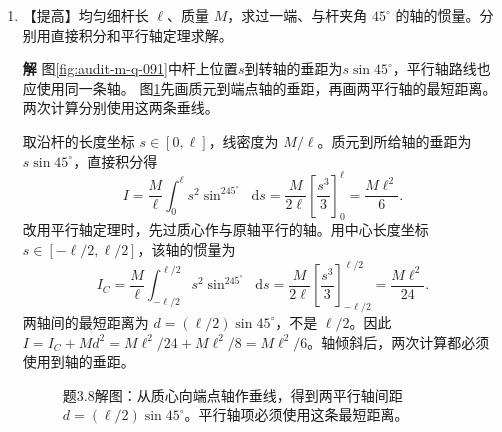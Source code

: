 \documentclass[11pt,openany,fontset=fandol]{ctexbook}
\theoremstyle{plain}\newtheorem{theorem}{定理}[chapter]\newtheorem{proposition}[theorem]{命题}
\theoremstyle{definition}\newtheorem{definition}{定义}[chapter]\newtheorem{example}{例}[chapter]
\theoremstyle{remark}\newtheorem*{remark}{说明}
\newcommand{\SolutionStart}{\par\nobreak\medskip\nobreak\noindent\textbf{解}\quad\ignorespaces}
\newenvironment{solution}{\SolutionStart}{\par\medskip}
\newcommand{\dd}{\mathop{}\!\mathrm d}\newcommand{\ii}{\mathrm i}\newcommand{\ee}{\mathrm e}
\begin{document}
\begin{enumerate}[label=3.\arabic*]
\begin{solution}
具体取 $\eta=1$，则 $U=k(x+y)^2/2$，零方向为 $x=-y$。分别补上 $+\alpha(x-y)^4$ 和 $-\alpha(x-y)^4$，$\alpha>0$。前者在所有非零的小位移处都比原点势能高，原点成为严格极小点；后者沿 $x=-y$ 降低，原点不稳定。两种势能在原点的二阶导数完全相同。故出现零特征值时，二阶展开只能找出需要继续检查的方向，必须结合高阶项判断完整系统。

两条曲线在原点的二阶曲率同为零。沿零方向保留四次项后，一条势能升高，另一条降低，稳定性才得以区分。
\end{solution}

\item \begin{minipage}[t]{\linewidth}
【提高】均匀细杆长 $\ell$、质量 $M$，求过一端、与杆夹角 $45^\circ$ 的轴的惯量。分别用直接积分和平行轴定理求解。

\end{minipage}

\begin{solution}
图\ref{fig:audit-m-q-091}中杆上位置$s$到转轴的垂距为$s\sin45^\circ$，平行轴路线也应使用同一条轴。
图\ref{fig:ex-3-8}先画质元到端点轴的垂距，再画两平行轴的最短距离。两次计算分别使用这两条垂线。

取沿杆的长度坐标 $s\in[0,\ell]$，线密度为 $M/\ell$。质元到所给轴的垂距为 $s\sin45^\circ$，直接积分得
\[
I=\frac M\ell\int_0^\ell s^2\sin^245^\circ\dd s
=\frac{M}{2\ell}\left[\frac{s^3}{3}\right]_0^\ell
=\frac{M\ell^2}{6}.
\]
改用平行轴定理时，先过质心作与原轴平行的轴。用中心长度坐标 $s\in[-\ell/2,\ell/2]$，该轴的惯量为
\[
I_C=\frac M\ell\int_{-\ell/2}^{\ell/2}s^2\sin^245^\circ\dd s
=\frac{M}{2\ell}\left[\frac{s^3}{3}\right]_{-\ell/2}^{\ell/2}
=\frac{M\ell^2}{24}.
\]
两轴间的最短距离为 $d=(\ell/2)\sin45^\circ$，不是 $\ell/2$。因此 $I=I_C+Md^2=M\ell^2/24+M\ell^2/8=M\ell^2/6$。轴倾斜后，两次计算都必须使用到轴的垂距。

\begin{figure}[H]\centering
{}
\caption{题3.8解图：从质心向端点轴作垂线，得到两平行轴间距 $d=(\ell/2)\sin45^\circ$。平行轴项必须使用这条最短距离。}\label{fig:ex-3-8}
\end{figure}


\end{solution}
\end{enumerate}
\end{document}
